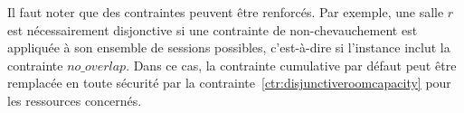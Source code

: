 %



Il faut noter que des contraintes peuvent être renforcés. 
Par exemple, une salle $r$ est nécessairement disjonctive si une contrainte de non-chevauchement est appliquée à son ensemble de sessions possibles, c'est-à-dire si l'instance inclut la contrainte ${no\_overlap}$.
Dans ce cas, la contrainte cumulative par défaut peut être remplacée en toute sécurité par la contrainte~\ref{ctr:disjunctiveroomcapacity} pour les ressources concernés.


